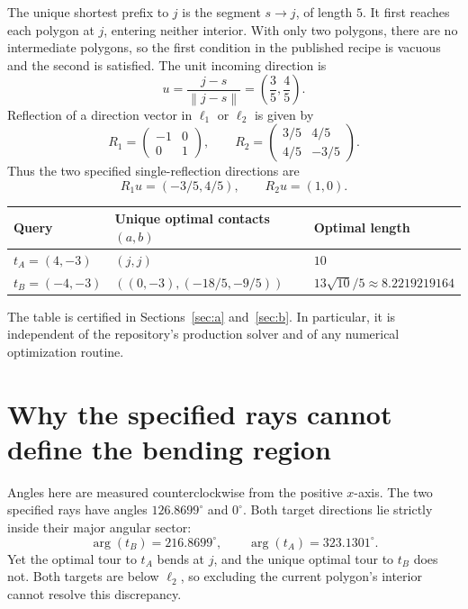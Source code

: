 \documentclass[11pt,a4paper]{article}
\newcommand{\norm}[1]{\left\lVert#1\right\rVert}
\newcommand{\sect}[2]{\section{#1}\label{#2}}
\begin{document}
The unique shortest prefix to $j$ is the segment $s\to j$, of length $5$.
It first reaches each polygon at $j$, entering neither interior. With only two
polygons, there are no intermediate polygons, so the first condition in the
published recipe is vacuous and the second is satisfied. The unit incoming
direction is
\begin{equation}
 u=\frac{j-s}{\norm{j-s}}=\left(\frac35,\frac45\right).
\end{equation}
Reflection of a direction vector in $\ell_1$ or $\ell_2$ is given by
\begin{equation}
 R_1=\begin{pmatrix}-1&0\\0&1\end{pmatrix},\qquad
 R_2=\begin{pmatrix}3/5&4/5\\4/5&-3/5\end{pmatrix}.
 \label{eq:reflections}
\end{equation}
Thus the two specified single-reflection directions are
\begin{equation}
 \boxed{R_1u=(-3/5,4/5)},\qquad \boxed{R_2u=(1,0)}.
 \label{eq:paper-rays}
\end{equation}

\begin{center}
\renewcommand{\arraystretch}{1.22}
\begin{tabular}{@{}lll@{}}
\toprule
Query & Unique optimal contacts $(a,b)$ & Optimal length\\
\midrule
$t_A=(4,-3)$ & $(j,j)$ & $10$\\
$t_B=(-4,-3)$ & $((0,-3),(-18/5,-9/5))$ & $13\sqrt{10}/5\approx8.2219219164$\\
\bottomrule
\end{tabular}
\end{center}
The table is certified in Sections~\ref{sec:a} and~\ref{sec:b}. In particular,
it is independent of the repository's production solver and of any numerical
optimization routine.

\clearpage
\sect{Why the specified rays cannot define the bending region}{sec:contradiction}

Angles here are measured counterclockwise from the positive $x$-axis. The two
specified rays have angles $126.8699^\circ$ and $0^\circ$. Both target directions
lie strictly inside their major angular sector:
\[
 \arg(t_B)=216.8699^\circ,\qquad \arg(t_A)=323.1301^\circ.
\]
Yet the optimal tour to $t_A$ bends at $j$, and the unique optimal tour to $t_B$
does not. Both targets are below $\ell_2$, so excluding the current polygon's
interior cannot resolve this discrepancy.
\end{document}
